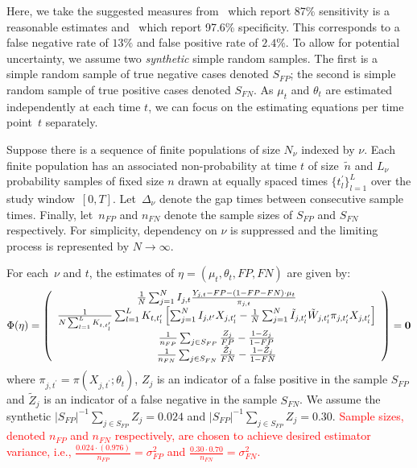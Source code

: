 \documentclass[11pt]{amsart}
\numberwithin{equation}{section}
\theoremstyle{plain}
\begin{document}

Here, we take the suggested measures from~\cite{Arevalo2020} which report 87\% sensitivity is a reasonable estimates and~\cite{Cohen2020} which report 97.6\% specificity.  This corresponds to a false negative rate of $13\%$ and false positive rate of $2.4\%$.  To allow for potential uncertainty, we assume two \emph{synthetic} simple random samples.  The first is a simple random sample of true negative cases denoted $S_{FP}$; the second is simple random sample of true positive cases denoted $S_{FN}$.  As $\mu_t$ and $\theta_{t}$ are estimated independently at each time $t$, we can focus on the estimating equations per time point~$t$ separately.

Suppose there is a sequence of finite populations of size $N_{\nu}$ indexed by $\nu$.  Each finite population has an associated non-probability at time $t$ of  size~$\tilde n$ and $L_\nu$ probability samples of fixed size $n$ drawn at equally spaced times $\{ t^\prime_l \}_{l=1}^L$ over the study window~$[0,T]$. Let~$\Delta_\nu$ denote the gap times between consecutive sample times.  Finally, let~$n_{FP}$ and $n_{FN}$ denote the sample sizes of $S_{FP}$ and $S_{FN}$ respectively.  For simplicity, dependency on $\nu$ is suppressed and the limiting process is represented by $N \to \infty$.

For each~$\nu$ and $t$, the estimates of $\eta = (\mu_t, \theta_t, FP, FN)$ are given by:
$$
\Phi (\eta) = \left (
\begin{array}{c}
\frac{1}{N} \sum_{j=1}^N I_{j,t} \frac{Y_{j,t} - FP - (1-FP-FN) \cdot \mu_t}{\pi_{j,t}} \\
\frac{1}{N \sum_{l=1}^L K_{t,t_l^\prime}} \sum_{l=1}^L K_{t,t_l^\prime} \left[ \sum_{j=1}^N I_{j,t^\prime} X_{j,t^\prime_l} - \frac{1}{N} \sum_{j = 1}^N \tilde I_{j,t_l^\prime} \tilde W_{j,t_l^\prime}  \pi_{j,t_l^\prime} X_{j,t_l^\prime} \right] \\
\frac{1}{n_{FP}} \sum_{j \in S_{FP}} \frac{Z_j}{FP} - \frac{1-Z_j}{1-FP} \\
\frac{1}{n_{FN}} \sum_{j \in S_{FN}} \frac{\tilde Z_j}{FN} - \frac{1-\tilde Z_j}{1-FN} \\
\end{array}
\right ) = {\bf 0}
$$
where $\pi_{j,t^\prime} = \pi (X_{j,t^\prime}; \theta_t)$, $Z_j$ is an indicator of a false positive in the sample $S_{FP}$  and $\tilde Z_j$ is an indicator of a false negative in the sample $S_{FN}$.  We assume the synthetic $|S_{FP}|^{-1} \sum_{j \in S_{FP}} Z_j = 0.024$ and $|S_{FP}|^{-1} \sum_{j \in S_{FP}} Z_j = 0.30$.  \textcolor{red}{Sample sizes, denoted $n_{FP}$ and $n_{FN}$ respectively, are chosen to achieve desired estimator variance, i.e., $\frac{0.024 \cdot (0.976)}{n_{FP}} = \sigma^2_{FP}$ and $\frac{0.30 \cdot 0.70}{n_{FN}} = \sigma^2_{FN}$.}
\end{document}
